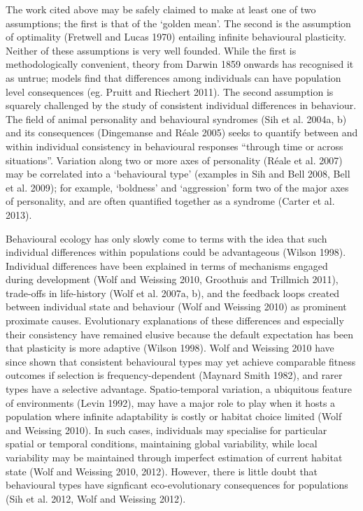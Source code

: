 \documentclass[]{scrartcl}
\begin{document}
\begin{linenumbers}
The work cited above may be safely claimed to make at least one of two
assumptions; the first is that of the `golden mean'. The second is the assumption of
optimality (Fretwell and Lucas 1970) entailing infinite behavioural
plasticity. Neither of these assumptions is very well founded. While the
first is methodologically convenient, theory from Darwin 1859 onwards
has recognised it as untrue; models find that differences among
individuals can have population level consequences (eg. Pruitt and
Riechert 2011). The second assumption is squarely challenged by the
study of consistent individual differences in behaviour. The field of
animal personality and behavioural syndromes (Sih et al. 2004a, b) and
its consequences
(\protect\hypertarget{__UnoMark__44474_2549695377}{}{\protect\hypertarget{__UnoMark__53900_4107183634}{}{\protect\hypertarget{ZOTERO_BREF_pK0LuydZRLN9}{}{\protect\hypertarget{__UnoMark__39595_623588325}{}{}}}}Dingemanse
and Réale 2005) seeks to quantify between and within individual
consistency in behavioural responses ``through time or across
situations''. Variation along two or more axes of personality
(\protect\hypertarget{__UnoMark__44475_2549695377}{}{\protect\hypertarget{ZOTERO_BREF_S1piFXmJVFzL}{}{\protect\hypertarget{__UnoMark__53901_4107183634}{}{\protect\hypertarget{__UnoMark__39596_623588325}{}{}}}}Réale
et al. 2007) may be correlated into a `behavioural type' (examples in
Sih and Bell 2008, Bell et al. 2009); for example, `boldness' and
`aggression' form two of the major axes of personality, and are often
quantified together as a syndrome (Carter et al. 2013).

Behavioural ecology has only slowly come to terms with the idea that
such individual differences within populations could be advantageous
(Wilson 1998). Individual differences have been explained in terms of
mechanisms engaged during development (Wolf and Weissing 2010, Groothuis
and Trillmich 2011), trade-offs in life-history (Wolf et al. 2007a, b),
and the feedback loops created between individual state and behaviour
(Wolf and Weissing 2010) as prominent proximate causes. Evolutionary
explanations of these differences and especially their consistency have
remained elusive because the default expectation has been that
plasticity is more adaptive (Wilson 1998). Wolf and Weissing 2010 have
since shown that consistent behavioural types may yet achieve comparable
fitness outcomes if selection is frequency-dependent (Maynard Smith
1982), and rarer types have a selective advantage. Spatio-temporal
variation, a ubiquitous feature of environments (Levin 1992), may have a
major role to play when it hosts a population where infinite
adaptability is costly or habitat choice limited (Wolf and Weissing
2010). In such cases, individuals may specialise for particular spatial
or temporal conditions, maintaining global variability, while local
variability may be maintained through imperfect estimation of current
habitat state (Wolf and Weissing 2010, 2012). However, there is little
doubt that behavioural types have signficant eco-evolutionary
consequences for populations (Sih et al. 2012, Wolf and Weissing 2012).


\end{linenumbers}
\end{document}
